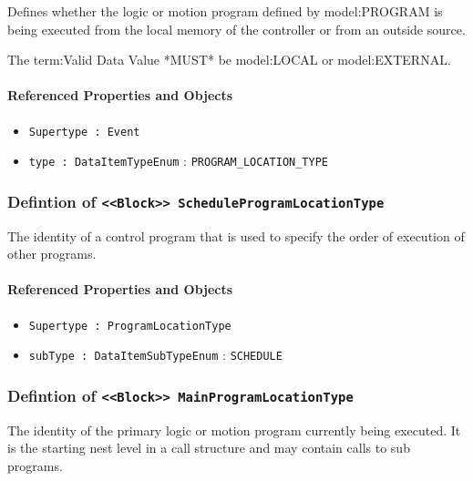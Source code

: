 \FloatBarrier

Defines whether the logic or motion program defined by {model:PROGRAM} is being executed from the local memory of the controller or from an outside source.
  
 The {term:Valid Data Value} *MUST* be {model:LOCAL} or {model:EXTERNAL}.

\FloatBarrier
\paragraph{Referenced Properties and Objects}

\begin{itemize}
\item \texttt{Supertype : Event}

\item \texttt{type : DataItemTypeEnum} : \texttt{PROGRAM_LOCATION_TYPE}

\end{itemize}
\FloatBarrier
\subsubsection{Defintion of \texttt{<<Block>> ScheduleProgramLocationType}}
  \label{type:ScheduleProgramLocationType}

\FloatBarrier

The identity of a control program that is used to specify the order of execution of other programs.

\FloatBarrier
\paragraph{Referenced Properties and Objects}

\begin{itemize}
\item \texttt{Supertype : ProgramLocationType}

\item \texttt{subType : DataItemSubTypeEnum} : \texttt{SCHEDULE}

\end{itemize}
\FloatBarrier
\subsubsection{Defintion of \texttt{<<Block>> MainProgramLocationType}}
  \label{type:MainProgramLocationType}

\FloatBarrier

The identity of the primary logic or motion program currently being executed. It is the starting nest level in a call structure and may contain calls to sub programs.

